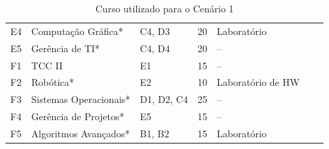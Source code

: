 \begin{table}
\begin{tabular*}{1\textwidth}{@{}lllllll@{}}
    E4 & Computação Gráfica*    & C4, D3 & 20 & Laboratório \\
    E5 & Gerência de TI*        & C4, D4 & 20 & -- \\
    \midrule
    F1 & TCC II                 & E1 & 15 & -- \\
    F2 & Robótica*              & E2 & 10 & Laboratório de HW \\
    F3 & Sistemas Operacionais* & D1, D2, C4 & 25 & -- \\
    F4 & Gerência de Projetos*  & E5 & 15 & -- \\
    F5 & Algoritmos Avançados*  & B1, B2 & 15 & Laboratório \\
    \bottomrule
  \end{tabular*}
  \caption{Curso utilizado para o Cenário 1}
  \label{tab:curso}
\end{table}


